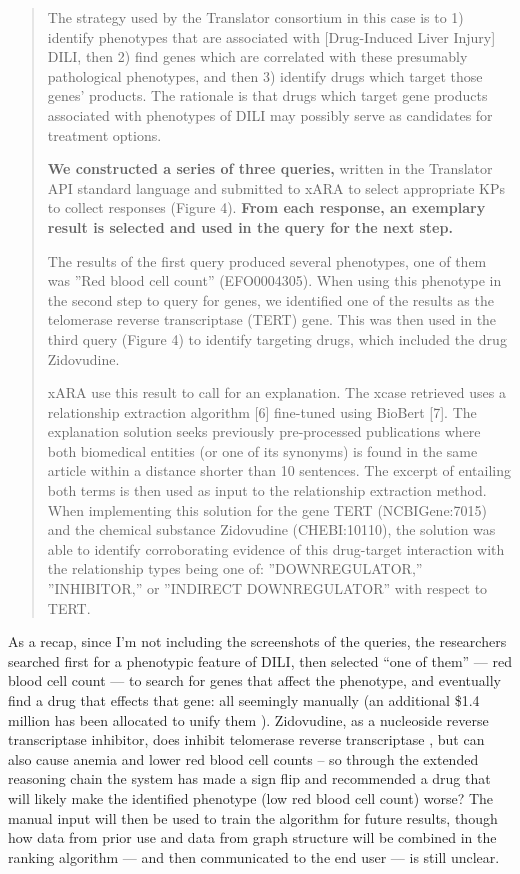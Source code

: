 \documentclass[notoc]{tufte-book}
\begin{document}
\begin{quote}
The strategy used by the Translator consortium in this case is to 1)
identify phenotypes that are associated with {[}Drug-Induced Liver
Injury{]} DILI, then 2) find genes which are correlated with these
presumably pathological phenotypes, and then 3) identify drugs which
target those genes' products. The rationale is that drugs which target
gene products associated with phenotypes of DILI may possibly serve as
candidates for treatment options.

\textbf{We constructed a series of three queries,} written in the
Translator API standard language and submitted to xARA to select
appropriate KPs to collect responses (Figure 4). \textbf{From each
response, an exemplary result is selected and used in the query for the
next step.}

The results of the first query produced several phenotypes, one of them
was ''Red blood cell count'' (EFO0004305). When using this phenotype in
the second step to query for genes, we identified one of the results as
the telomerase reverse transcriptase (TERT) gene. This was then used in
the third query (Figure 4) to identify targeting drugs, which included
the drug Zidovudine.

xARA use this result to call for an explanation. The xcase retrieved
uses a relationship extraction algorithm {[}6{]} fine-tuned using
BioBert {[}7{]}. The explanation solution seeks previously pre-processed
publications where both biomedical entities (or one of its synonyms) is
found in the same article within a distance shorter than 10 sentences.
The excerpt of entailing both terms is then used as input to the
relationship extraction method. When implementing this solution for the
gene TERT (NCBIGene:7015) and the chemical substance Zidovudine
(CHEBI:10110), the solution was able to identify corroborating evidence
of this drug-target interaction with the relationship types being one
of: ''DOWNREGULATOR,'' ''INHIBITOR,'' or ''INDIRECT DOWNREGULATOR'' with
respect to TERT. \citep{goelExplanationContainerCaseBased2021} 
\end{quote}

As a recap, since I'm not including the screenshots of the queries, the
researchers searched first for a phenotypic feature of DILI, then
selected ``one of them'' --- red blood cell count --- to search for
genes that affect the phenotype, and eventually find a drug that effects
that gene: all seemingly manually (an additional \$1.4 million has been
allocated to unify them \citep{haendelCommonDialectInfrastructure2021} ). Zidovudine, as a nucleoside reverse transcriptase inhibitor, does
inhibit telomerase reverse transcriptase \citep{hukezalieVitroExVivo2012} , but can also cause anemia and lower red
blood cell counts \citep{ZidovudinePatientNIH}  -- so through the
extended reasoning chain the system has made a sign flip and recommended
a drug that will likely make the identified phenotype (low red blood
cell count) worse? The manual input will then be used to train the
algorithm for future results, though how data from prior use and data
from graph structure will be combined in the ranking algorithm --- and
then communicated to the end user --- is still unclear.
\end{document}
